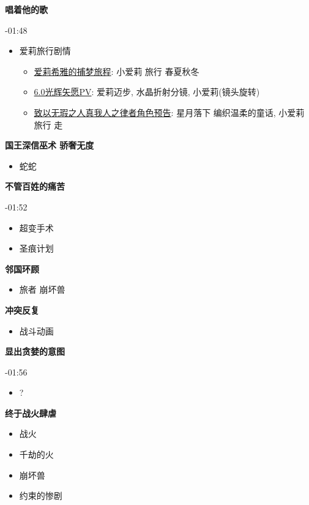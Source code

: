 \documentclass[a4paper]{article}
\begin{document}
\textbf{唱着他的歌}

-01:48

\begin{itemize}
    \item 爱莉旅行剧情
    \begin{itemize}
        \item \href{https://www.bilibili.com/video/BV1ZW4y1t7Zf/}{爱莉希雅的捕梦旅程}: 小爱莉 旅行 春夏秋冬
        \item \href{https://www.bilibili.com/video/BV1Mg411k7U5/}{6.0光辉矢愿PV}: 爱莉迈步, 水晶折射分镜, 小爱莉(镜头旋转)
        \item \href{https://www.bilibili.com/video/BV1DS4y1t7rs/}{致以无瑕之人真我人之律者角色预告}: 星月落下 编织温柔的童话, 小爱莉 旅行 走
    \end{itemize}
\end{itemize}

\textbf{国王深信巫术 骄奢无度}

\begin{itemize}
    \item 蛇蛇
\end{itemize}

\textbf{不管百姓的痛苦}

-01:52

\begin{itemize}
    \item 超变手术
    \item 圣痕计划
\end{itemize}

\textbf{邻国环顾}

\begin{itemize}
    \item 旅者 崩坏兽
\end{itemize}

\textbf{冲突反复}

\begin{itemize}
    \item 战斗动画
\end{itemize}

\textbf{显出贪婪的意图}

-01:56

\begin{itemize}
    \item ?
\end{itemize}

\textbf{终于战火肆虐}

\begin{itemize}
    \item 战火
    \item 千劫的火
    \item 崩坏兽
    \item 约束的惨剧
\end{itemize}
\end{document}

